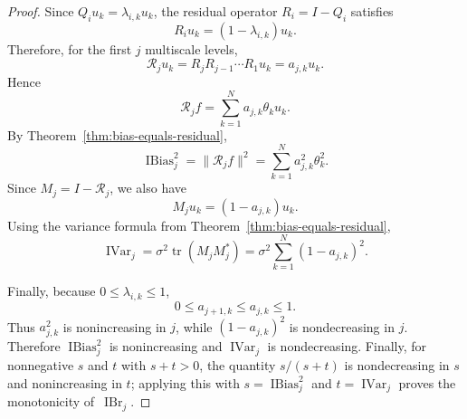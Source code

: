 \documentclass[10pt,a4paper]{amsart}
\newcommand{\ibias}{\operatorname{IBias}^2}
\DeclareMathOperator{\ibr}{IBr}
\DeclareMathOperator{\ivar}{IVar}
\begin{document}
\begin{proof}
Since \(Q_i u_k=\lambda_{i,k}u_k\), the residual operator \(R_i=I-Q_i\) satisfies
\[
    R_i u_k=(1-\lambda_{i,k})u_k .
\]
Therefore, for the first \(j\) multiscale levels,
\[
    \mathcal R_j u_k
    =
    R_jR_{j-1}\cdots R_1u_k
    =
    a_{j,k}u_k .
\]
Hence
\[
    \mathcal R_j f
    =
    \sum_{k=1}^N a_{j,k}\theta_k u_k .
\]
By Theorem~\ref{thm:bias-equals-residual},
\[
    \ibias_j=\|\mathcal R_j f\|^2
    =
    \sum_{k=1}^N a_{j,k}^2\theta_k^2 .
\]
Since \(M_j=I-\mathcal R_j\), we also have
\[
    M_j u_k=(1-a_{j,k})u_k .
\]
Using the variance formula from Theorem~\ref{thm:bias-equals-residual},
\[
    \ivar_j
    =
    \sigma^2\operatorname{tr}(M_jM_j^*)
    =
    \sigma^2
    \sum_{k=1}^N (1-a_{j,k})^2 .
\]

Finally, because \(0\leq \lambda_{i,k}\leq 1\),
\[
    0\leq a_{j+1,k}\leq a_{j,k}\leq 1 .
\]
Thus \(a_{j,k}^2\) is nonincreasing in \(j\), while \((1-a_{j,k})^2\) is nondecreasing in \(j\). Therefore \(\ibias_j\) is nonincreasing and \(\ivar_j\) is nondecreasing. Finally, for nonnegative \(s\) and \(t\) with \(s+t>0\), the quantity \(s/(s+t)\) is nondecreasing in \(s\) and nonincreasing in \(t\); applying this with \(s=\ibias_j\) and \(t=\ivar_j\) proves the monotonicity of~\(\ibr_j\).
\end{proof}
\end{document}
